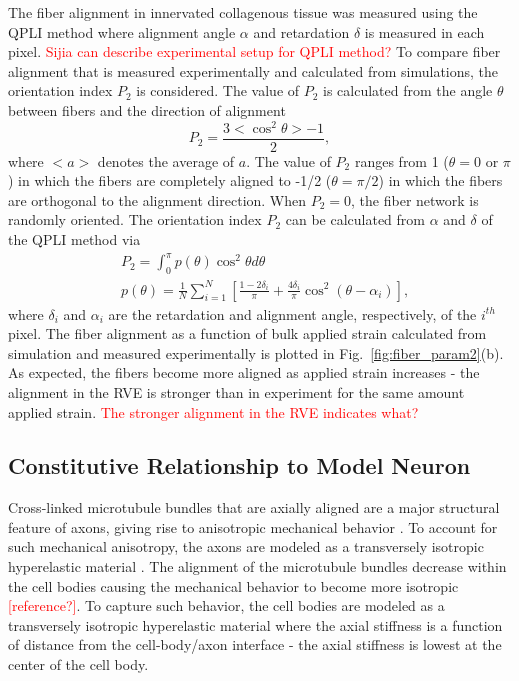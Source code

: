 \documentclass[10pt]{asme2ej}
\begin{document}
The fiber alignment in innervated collagenous tissue was measured using the QPLI method \cite{Quinn:2009bf} where alignment angle $\alpha$ and retardation $\delta$ is measured in each pixel. \textcolor{red}{Sijia can describe experimental setup for QPLI method?} To compare fiber alignment that is measured experimentally and calculated from simulations, the orientation index $P_2$ is considered. The value of $P_2$ is calculated from the angle $\theta$ between fibers and the direction of alignment
%
\begin{equation}
P_2 = \frac{3 <\cos^2\theta> - 1}{2},
\label{eq:P2_simulation}
\end{equation}
%
where $<a>$ denotes the average of $a$. The value of $P_2$ ranges from 1 ($\theta=0$ or $\pi$) in which the fibers are completely aligned to -1/2 ($\theta=\pi/2$) in which the fibers are orthogonal to the alignment direction. When $P_2=0$, the fiber network is randomly oriented. The orientation index $P_2$ can be calculated from $\alpha$ and $\delta$ of the QPLI method via
%
\begin{align}
&P_2 = \int_0^{\pi} p(\theta) \cos^2\theta d\theta \nonumber\\
&p(\theta) = \frac{1}{N} \sum_{i=1}^N \left[ \frac{1-2\delta_i}{\pi} + \frac{4 \delta_i}{\pi}\cos^2(\theta - \alpha_i)\right],
\label{eq:P2_experiment}
\end{align}
%
where $\delta_i$ and $\alpha_i$ are the retardation and alignment angle, respectively, of the $i^{th}$ pixel. The fiber alignment as a function of bulk applied strain calculated from simulation and measured experimentally is plotted in Fig.\ \ref{fig:fiber_param2}(b). As expected, the fibers become more aligned as applied strain increases - the alignment in the RVE is stronger than in experiment for the same amount applied strain. \textcolor{red}{The stronger alignment in the RVE indicates what?}

\subsection{Constitutive Relationship to Model Neuron}
Cross-linked microtubule bundles that are axially aligned are a major structural feature of axons, giving rise to anisotropic mechanical behavior \cite{Peter:2012fc}. To account for such mechanical anisotropy, the axons are modeled as a transversely isotropic hyperelastic material \cite{JavierBonet:2008uxa,Bonet:1998vc}. The alignment of the microtubule bundles decrease within the cell bodies causing the mechanical behavior to become more isotropic \textcolor{red}{[reference?]}. To capture such behavior, the cell bodies are modeled as a transversely isotropic hyperelastic material where the axial stiffness is a function of distance from the cell-body/axon interface - the axial stiffness is lowest at the center of the cell body. 
\end{document}
